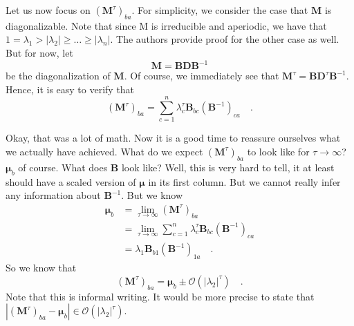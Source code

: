 \documentclass[../../main.tex]{subfiles}
\begin{document}
    Let us now focus on $(\boldsymbol{M}^{\tau})_{ba}$. For simplicity, we consider the case that $\boldsymbol{M}$ is diagonalizable. Note that since M is irreducible and aperiodic, we have that $1 = \lambda_1 > |\lambda_2| \geq \dots \geq |\lambda_n|$. The authors provide proof for the other case as well. But for now, let
    \[
        \boldsymbol{M} = \boldsymbol{BDB}^{-1}
    \]
    be the diagonalization of $\boldsymbol{M}$. Of course, we immediately see that $\boldsymbol{M}^\tau = \boldsymbol{BD}^\tau \boldsymbol{B}^{-1}$. Hence, it is easy to verify that
    \[
        (\boldsymbol{M}^\tau)_{ba} = \sum_{c = 1}^{n} \lambda_c^\tau \boldsymbol{B}_{bc}(\boldsymbol{B}^{-1})_{ca} \quad .
    \]

    \bigskip \noindent
    Okay, that was a lot of math. Now it is a good time to reassure ourselves what we actually have achieved. What do we expect $(\boldsymbol{M}^\tau)_{ba}$ to look like for $\tau \rightarrow \infty$? $\boldsymbol{\mu}_b$ of course. What does $\boldsymbol{B}$ look like? Well, this is very hard to tell, it at least should have a scaled version of $\boldsymbol{\mu}$ in its first column. But we cannot really infer any information about $\boldsymbol{B}^{-1}$. But we know
    \begin{align*}
        \boldsymbol{\mu}_b &= \lim_{\tau \to \infty} (\boldsymbol{M}^\tau)_{ba} \\
        &= \lim_{\tau \to \infty} \sum_{c = 1}^{n} \lambda_c^\tau \boldsymbol{B}_{bc}(\boldsymbol{B}^{-1})_{ca} \\
        &= \lambda_1 \boldsymbol{B}_{b1}(\boldsymbol{B}^{-1})_{1a} \quad .
    \end{align*}
    So we know that
    \[
        (\boldsymbol{M}^\tau)_{ba} = \boldsymbol{\mu}_b \pm \mathcal{O}(|\lambda_2|^\tau) \quad .
    \]
    Note that this is informal writing. It would be more precise to state that $|(\boldsymbol{M}^\tau)_{ba} - \boldsymbol{\mu}_b| \in \mathcal{O}(|\lambda_2|^\tau)$.
\end{document}
